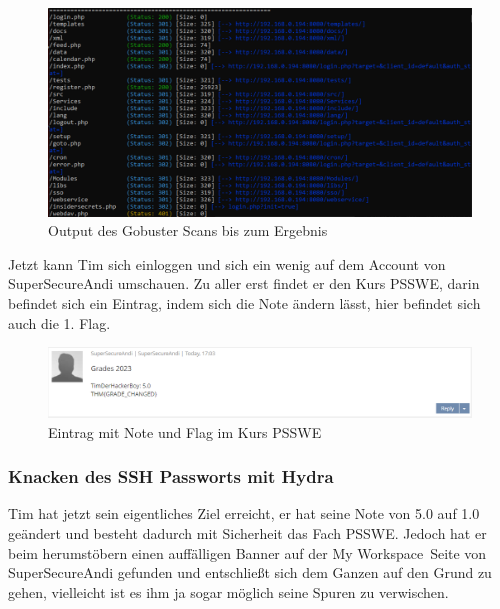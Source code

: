 \documentclass[10pt, a4paper,onecolumn ,titlepage]{article}
\begin{document}
    \begin{figure}[H]
        \centering
        \includegraphics[width=1\textwidth]{VM1_Bilder/GobusterScan.PNG}
        \caption{Output des Gobuster Scans bis zum Ergebnis}
        \label{fig:GobusterScan}
    \end{figure}

    \noindent
    Jetzt kann Tim sich einloggen und sich ein wenig auf dem Account von SuperSecureAndi umschauen.
    Zu aller erst findet er den Kurs PSSWE, darin befindet sich ein Eintrag, indem sich die Note ändern lässt, hier befindet sich auch die 1. Flag.

    \begin{figure}[H]
        \centering
        \includegraphics[width=1\textwidth]{VM1_Bilder/ForumPost.PNG}
        \caption{Eintrag mit Note und Flag im Kurs PSSWE}
        \label{fig:ForumPost}
    \end{figure}

    \subsubsection{Knacken des SSH Passworts mit Hydra}
    Tim hat jetzt sein eigentliches Ziel erreicht, er hat seine Note von 5.0 auf 1.0 geändert und besteht dadurch mit Sicherheit das Fach PSSWE.
    Jedoch hat er beim herumstöbern einen auffälligen Banner auf der \glqq My Workspace\grqq\ Seite von SuperSecureAndi gefunden und entschließt sich dem Ganzen auf den Grund zu gehen,
    vielleicht ist es ihm ja sogar möglich seine Spuren zu verwischen.
\end{document}
